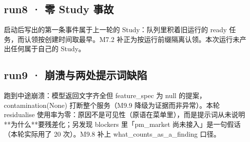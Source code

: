 \documentclass[11pt]{ctexart}
\begin{document}
\clearpage
\subsection{run8 · 零 Study 事故}
启动后写出的第一条事件属于上一轮的 Study：队列里积着旧运行的 ready 任务，而认领按创建时间取最早。M7.2 补正为按运行前缀隔离认领。本次运行未产出任何属于自己的 Study。



\clearpage
\subsection{run9 · 崩溃与两处提示词缺陷}
跑到中途崩溃：模型返回文字齐全但 feature\_spec 为 null 的提案，contamination(None) 打断整个服务（M9.9 降级为证据而非异常）。本轮 residualise 使用率为零：原因不是可见性（原语在菜单里），而是提示词从未说明**为什么**要残差化；另发现 blockers 里「pm\_market 尚未接入」是一句假话（本轮实际用了 20 次）。M9.8 补上 what\_counts\_as\_a\_finding 口径。
\end{document}
